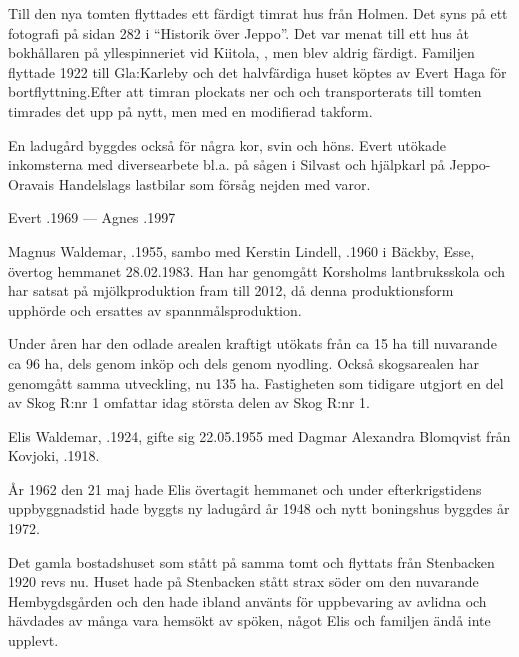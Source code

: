 Till den nya tomten flyttades ett färdigt timrat hus från Holmen. Det syns på ett fotografi på sidan 282 i ``Historik över Jeppo''. Det var menat till ett hus åt bokhållaren på yllespinneriet vid Kiitola, , men blev aldrig färdigt. Familjen flyttade 1922 till Gla:Karleby och det halvfärdiga huset köptes av Evert Haga för bortflyttning.Efter att timran plockats ner och och transporterats till tomten timrades det upp på nytt, men med en modifierad takform.

En ladugård byggdes också för några kor, svin och höns. Evert utökade inkomsterna med diversearbete bl.a. på sågen i Silvast och hjälpkarl på Jeppo-Oravais Handelslags lastbilar som försåg nejden med varor.

Evert .1969   ---    Agnes .1997






Magnus Waldemar, .1955, sambo med Kerstin Lindell, .1960 i Bäckby, Esse, övertog hemmanet 28.02.1983. Han har genomgått Korsholms lantbruksskola och har satsat på mjölkproduktion fram till 2012, då denna produktionsform upphörde och ersattes av spannmålsproduktion.

Under åren har den odlade arealen kraftigt utökats från ca 15 ha till nuvarande ca 96 ha, dels genom inköp och dels genom nyodling. Också skogsarealen har genomgått samma utveckling, nu 135 ha. Fastigheten som tidigare utgjort en del av Skog R:nr 1 omfattar idag största delen av Skog R:nr 1.

Elis Waldemar, .1924, gifte sig 22.05.1955 med Dagmar Alexandra Blomqvist från Kovjoki, .1918.

År 1962 den 21 maj hade Elis övertagit hemmanet och under efterkrigstidens uppbyggnadstid hade byggts ny ladugård år 1948 och nytt boningshus byggdes år 1972.

Det gamla bostadshuset som stått på samma tomt och flyttats från Stenbacken 1920 revs nu. Huset hade på Stenbacken stått strax söder om den nuvarande Hembygdsgården och den hade ibland använts för uppbevaring av avlidna och hävdades av många vara hemsökt av spöken, något Elis och familjen ändå inte upplevt.

